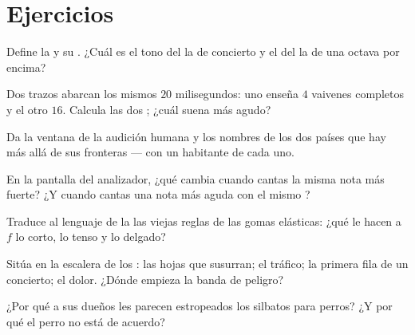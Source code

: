\section{Ejercicios}

\begin{exercise}[$\star$]\label{exo:g8:sound-pitch-loudness:1}
Define la  y su . ¿Cuál es el tono del la
de concierto y el del la de una octava por encima?
\end{exercise}

\begin{exercise}[$\star$]\label{exo:g8:sound-pitch-loudness:2}
Dos trazos abarcan los mismos $20$ milisegundos: uno enseña $4$
vaivenes completos y el otro $16$. Calcula las dos ; ¿cuál
suena más agudo?
\end{exercise}

\begin{exercise}[$\star$]\label{exo:g8:sound-pitch-loudness:3}
Da la ventana de la audición humana y los nombres de los dos países
que hay más allá de sus fronteras --- con un habitante de cada uno.
\end{exercise}

\begin{exercise}[$\star$]\label{exo:g8:sound-pitch-loudness:4}
En la pantalla del analizador, ¿qué cambia cuando cantas la misma nota
más fuerte? ¿Y cuando cantas una nota más aguda con el mismo ?
\end{exercise}

\begin{exercise}[$\star$]\label{exo:g8:sound-pitch-loudness:5}
Traduce al lenguaje de la  las viejas reglas de las gomas
elásticas: ¿qué le hacen a $f$ lo corto, lo tenso y lo delgado?
\end{exercise}

\begin{exercise}[$\star$]\label{exo:g8:sound-pitch-loudness:6}
Sitúa en la escalera de los : las hojas que susurran; el
tráfico; la primera fila de un concierto; el dolor. ¿Dónde empieza la
banda de peligro?
\end{exercise}

\begin{exercise}[$\star$]\label{exo:g8:sound-pitch-loudness:7}
¿Por qué a sus dueños les parecen estropeados los silbatos para perros?
¿Y por qué el perro no está de acuerdo?
\end{exercise}

